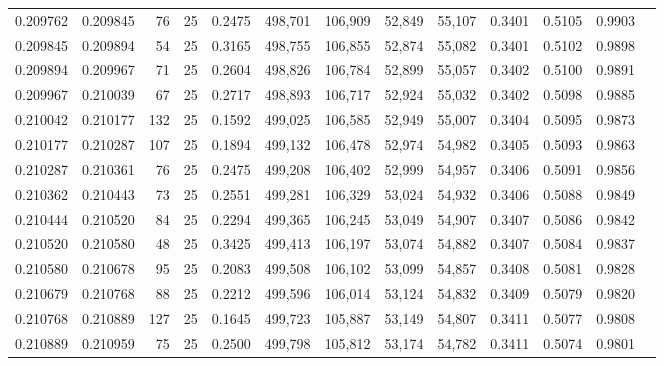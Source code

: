 \begin{tabular}{rrrrrrrrrrrrr}
0.209762 & 0.209845 &    76 &  25 &                                     0.2475 & 498,701 & 106,909 &  52,849 &  55,107 & 0.3401 & 0.5105 & 0.9903 \\
0.209845 & 0.209894 &    54 &  25 &                                     0.3165 & 498,755 & 106,855 &  52,874 &  55,082 & 0.3401 & 0.5102 & 0.9898 \\
0.209894 & 0.209967 &    71 &  25 &                                     0.2604 & 498,826 & 106,784 &  52,899 &  55,057 & 0.3402 & 0.5100 & 0.9891 \\
0.209967 & 0.210039 &    67 &  25 &                                     0.2717 & 498,893 & 106,717 &  52,924 &  55,032 & 0.3402 & 0.5098 & 0.9885 \\
0.210042 & 0.210177 &   132 &  25 &                                     0.1592 & 499,025 & 106,585 &  52,949 &  55,007 & 0.3404 & 0.5095 & 0.9873 \\
0.210177 & 0.210287 &   107 &  25 &                                     0.1894 & 499,132 & 106,478 &  52,974 &  54,982 & 0.3405 & 0.5093 & 0.9863 \\
0.210287 & 0.210361 &    76 &  25 &                                     0.2475 & 499,208 & 106,402 &  52,999 &  54,957 & 0.3406 & 0.5091 & 0.9856 \\
0.210362 & 0.210443 &    73 &  25 &                                     0.2551 & 499,281 & 106,329 &  53,024 &  54,932 & 0.3406 & 0.5088 & 0.9849 \\
0.210444 & 0.210520 &    84 &  25 &                                     0.2294 & 499,365 & 106,245 &  53,049 &  54,907 & 0.3407 & 0.5086 & 0.9842 \\
0.210520 & 0.210580 &    48 &  25 &                                     0.3425 & 499,413 & 106,197 &  53,074 &  54,882 & 0.3407 & 0.5084 & 0.9837 \\
0.210580 & 0.210678 &    95 &  25 &                                     0.2083 & 499,508 & 106,102 &  53,099 &  54,857 & 0.3408 & 0.5081 & 0.9828 \\
0.210679 & 0.210768 &    88 &  25 &                                     0.2212 & 499,596 & 106,014 &  53,124 &  54,832 & 0.3409 & 0.5079 & 0.9820 \\
0.210768 & 0.210889 &   127 &  25 &                                     0.1645 & 499,723 & 105,887 &  53,149 &  54,807 & 0.3411 & 0.5077 & 0.9808 \\
0.210889 & 0.210959 &    75 &  25 &                                     0.2500 & 499,798 & 105,812 &  53,174 &  54,782 & 0.3411 & 0.5074 & 0.9801 \\

\end{tabular}
